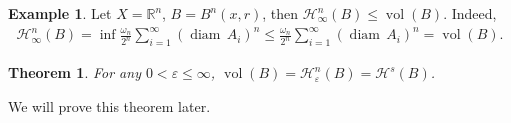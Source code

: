 \documentclass[11pt]{book}
\newtheorem{theorem}{Theorem}[chapter]
\theoremstyle{definition}
\newtheorem{example}{Example}[chapter]
\numberwithin{equation}{chapter}
\def\diam{{\operatorname{diam}\,}}
\begin{document}
\medskip

\begin{example}
Let $X = \mathbb{R}^n$, $B = B^n(x,r)$, then $\mathcal{H}^n_{\infty}(B) \leq \operatorname{vol}(B)$. Indeed,
\begin{align*}
    \mathcal{H}^n_{\infty}(B) = \inf \frac{\omega_n}{2^n} \sum^\infty_{i=1} \left(\diam A_i\right)^n \leq \frac{\omega_n}{2^n} \sum^\infty_{i=1} \left(\diam A_i\right)^n = \operatorname{vol}(B).
\end{align*}
\end{example}

\medskip

\begin{theorem}
For any $0 < \varepsilon \leq \infty$, $\operatorname{vol}(B) = \mathcal{H}^n_{\varepsilon}(B) = \mathcal{H}^s(B)$.
\end{theorem}

\medskip

We will prove this theorem later.

\medskip
\end{document}
